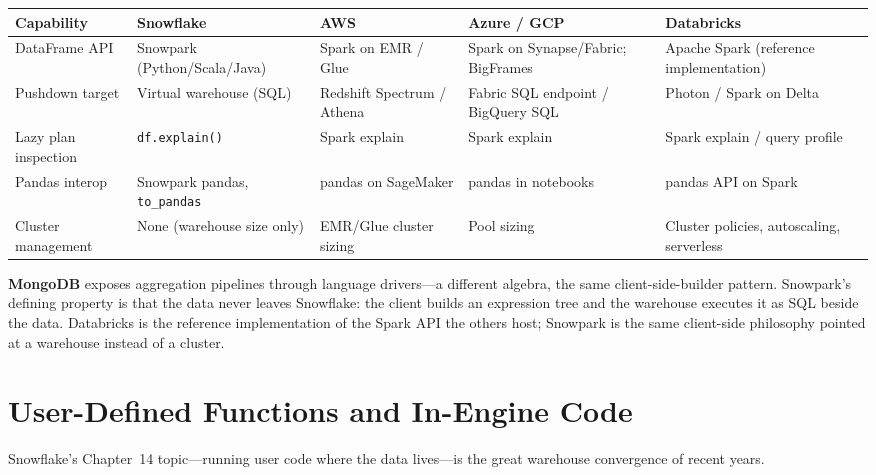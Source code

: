 \begin{center}
\footnotesize
\begin{tabular}{@{}p{2.5cm}p{2.9cm}p{2.7cm}p{2.9cm}p{2.9cm}@{}}
\toprule
\textbf{Capability} & \textbf{Snowflake} & \textbf{AWS} & \textbf{Azure / GCP} & \textbf{Databricks} \\
\midrule
DataFrame API & Snowpark (Python/Scala/Java) & Spark on EMR / Glue & Spark on Synapse/Fabric; BigFrames & Apache Spark (reference implementation) \\
Pushdown target & Virtual warehouse (SQL) & Redshift Spectrum / Athena & Fabric SQL endpoint / BigQuery SQL & Photon / Spark on Delta \\
Lazy plan inspection & \texttt{df.explain()} & Spark explain & Spark explain & Spark explain / query profile \\
Pandas interop & Snowpark pandas, \texttt{to\_pandas} & pandas on SageMaker & pandas in notebooks & pandas API on Spark \\
Cluster management & None (warehouse size only) & EMR/Glue cluster sizing & Pool sizing & Cluster policies, autoscaling, serverless \\
\bottomrule
\end{tabular}
\end{center}

\noindent \textbf{MongoDB} exposes aggregation pipelines through language drivers---a different
algebra, the same client-side-builder pattern. Snowpark's defining property is that the data
never leaves Snowflake: the client builds an expression tree and the warehouse executes it as
SQL beside the data. Databricks is the reference implementation of the Spark API the others
host; Snowpark is the same client-side philosophy pointed at a warehouse instead of a cluster.

\section{User-Defined Functions and In-Engine Code}
%
Snowflake's Chapter~14 topic---running user code where the data lives---is the great warehouse
convergence of recent years.

